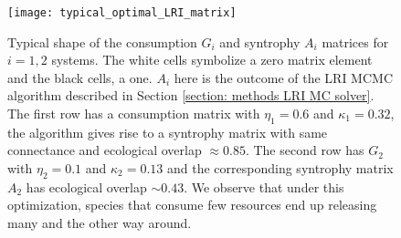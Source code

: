 \documentclass[12pt, titlepage]{report}
\begin{document}
\begin{figure}
\texttt{[image: typical\_optimal\_LRI\_matrix]}
\caption{Typical shape of the consumption $G_i$ and syntrophy $A_i$ matrices for $i=1,2$ systems. The white cells symbolize a zero matrix element and the black cells, a one. $A_i$ here is the outcome of the LRI MCMC algorithm described in Section \ref{section: methods LRI MC solver}. The first row has a consumption matrix with $\eta_1=0.6$ and $\kappa_1=0.32$, the algorithm gives rise to a syntrophy matrix with same connectance and ecological overlap $\approx 0.85$. The second row has $G_2$ with $\eta_2=0.1$ and $\kappa_2=0.13$ and the corresponding syntrophy matrix $A_2$ has ecological overlap $\sim 0.43$. We observe that under this optimization, species that consume few resources end up releasing many and the other way around.}\label{fig: dynamical stability results typical shape of consumption syntrophy LRI algorithm}
\end{figure}
\end{document}
